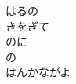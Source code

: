 \documentclass[10pt,b5j]{tarticle} %
\begin{document}
\begin{enumerate}
\begin{minipage}[c]{\blocksize}
        \vspace{\linespace}
        \item
        はるの\\
        きをぎて\\
        のに\\
        の\\
        はんかながよ
    
    \end{minipage}
\end{enumerate} %
\end{document}
